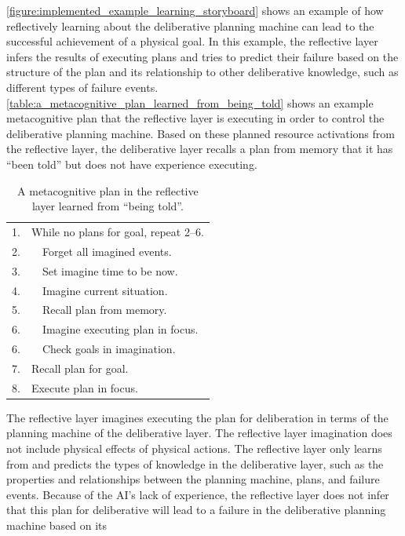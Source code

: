 {\mbox{\autoref{figure:implemented_example_learning_storyboard}}}
shows an example of how reflectively learning about the deliberative
planning machine can lead to the successful achievement of a physical
goal.  In this example, the reflective layer infers the results of
executing plans and tries to predict their failure based on the
structure of the plan and its relationship to other deliberative
knowledge, such as different types of failure events.
{\mbox{\autoref{table:a_metacognitive_plan_learned_from_being_told}}}
shows an example metacognitive plan that the reflective layer is
executing in order to control the deliberative planning machine.
Based on these planned resource activations from the reflective layer,
the deliberative layer recalls a plan from memory that it has ``been
told'' but does not have experience executing.
\begin{table}
\centering
\begin{tabular}{|rl|}
\hline
 1. & While no plans for goal, repeat 2--6.\\
 2. & ~~Forget all imagined events.\\
 3. & ~~Set imagine time to be now.\\
 4. & ~~Imagine current situation.\\
 5. & ~~Recall plan from memory.\\
 6. & ~~Imagine executing plan in focus.\\
 6. & ~~Check goals in imagination.\\
 7. & Recall plan for goal.\\
 8. & Execute plan in focus.\\
\hline
\end{tabular}
\caption[A metacognitive plan in the reflective layer learned from
  ``being told''.]{A metacognitive plan in the reflective layer
  learned from ``being told''.}
\label{table:a_metacognitive_plan_learned_from_being_told}
\end{table}
The reflective layer imagines executing the plan for deliberation in
terms of the planning machine of the deliberative layer.  The
reflective layer imagination does not include physical effects of
physical actions.  The reflective layer only learns from and predicts
the types of knowledge in the deliberative layer, such as the
properties and relationships between the planning machine, plans, and
failure events.  Because of the AI's lack of experience, the
reflective layer does not infer that this plan for deliberative will
lead to a failure in the deliberative planning machine based on its
